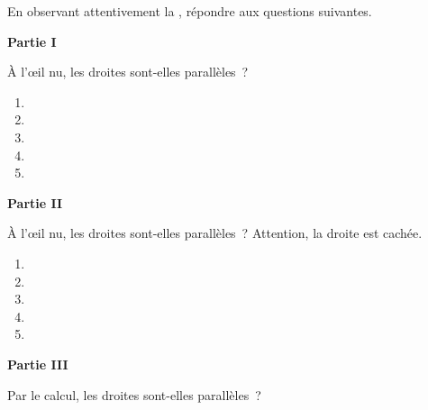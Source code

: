 \documentclass[activite]{thedocument}
\begin{document}
    En observant attentivement la 
    ,
    répondre aux questions suivantes.\par\noindent
    {\centering\Large\textbf{Partie I}\par}
    \bigskip\noindent
    À l'\oe il nu, les droites sont-elles parallèles~?
    \begin{enumerate}[label=Q\arabic* :, font=\bfseries]
        \item
        \item
        \item
        \item
        \item
    \end{enumerate}
    {\centering\Large\textbf{Partie II}\par}
    \bigskip\noindent
    À l'\oe il nu, les droites sont-elles parallèles~? Attention, la droite
     est cachée.
    \begin{enumerate}[label=Q\arabic* :, font=\bfseries]
        \item
        \item
        \item
        \item
        \item
    \end{enumerate}
    {\centering\Large\textbf{Partie III}\par}
    \bigskip\noindent
    Par le calcul, les droites sont-elles parallèles~?\par\noindent
    \answerspace{5 cm}
\end{document}
